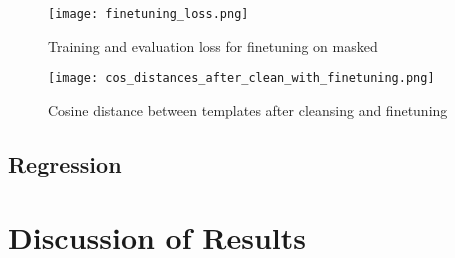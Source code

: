 \begin{figure}[h]
  \centering
  \texttt{[image: finetuning\_loss.png]}\\
  \caption{Training and evaluation loss for finetuning on masked }
  \label{fig:finetuning_loss}
\end{figure}

\begin{figure}[h]
  \centering
  \texttt{[image: cos\_distances\_after\_clean\_with\_finetuning.png]}\\
  \caption{Cosine distance between templates after cleansing and finetuning}
  \label{fig:cos_distance_finetuning}
\end{figure}


\subsection{Regression}

\section{Discussion of Results}
